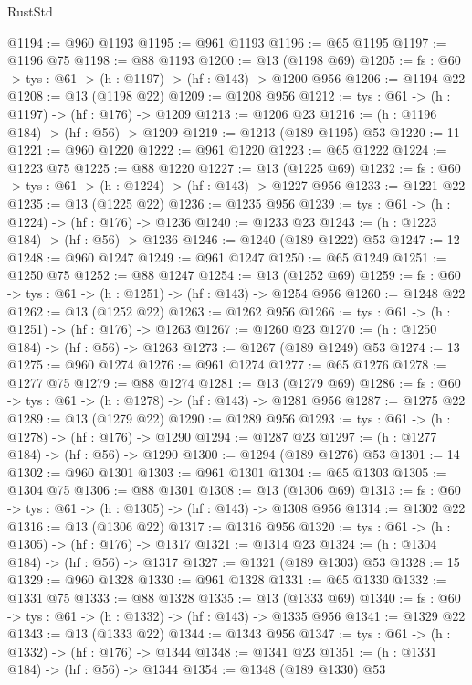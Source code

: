 \begin{lexlean}{RustStd}
\begin{coremodule}
@1194 := @960 @1193
@1195 := @961 @1193
@1196 := @65 @1195
@1197 := @1196 @75
@1198 := @88 @1193
@1200 := @13 (@1198 @69)
@1205 := {fs : @60} -> {tys : @61} -> (h : @1197) -> (hf : @143) -> @1200 @956
@1206 := @1194 @22
@1208 := @13 (@1198 @22)
@1209 := @1208 @956
@1212 := {tys : @61} -> (h : @1197) -> (hf : @176) -> @1209
@1213 := @1206 @23
@1216 := (h : @1196 @184) -> (hf : @56) -> @1209
@1219 := @1213 (@189 @1195) @53
@1220 := 11
@1221 := @960 @1220
@1222 := @961 @1220
@1223 := @65 @1222
@1224 := @1223 @75
@1225 := @88 @1220
@1227 := @13 (@1225 @69)
@1232 := {fs : @60} -> {tys : @61} -> (h : @1224) -> (hf : @143) -> @1227 @956
@1233 := @1221 @22
@1235 := @13 (@1225 @22)
@1236 := @1235 @956
@1239 := {tys : @61} -> (h : @1224) -> (hf : @176) -> @1236
@1240 := @1233 @23
@1243 := (h : @1223 @184) -> (hf : @56) -> @1236
@1246 := @1240 (@189 @1222) @53
@1247 := 12
@1248 := @960 @1247
@1249 := @961 @1247
@1250 := @65 @1249
@1251 := @1250 @75
@1252 := @88 @1247
@1254 := @13 (@1252 @69)
@1259 := {fs : @60} -> {tys : @61} -> (h : @1251) -> (hf : @143) -> @1254 @956
@1260 := @1248 @22
@1262 := @13 (@1252 @22)
@1263 := @1262 @956
@1266 := {tys : @61} -> (h : @1251) -> (hf : @176) -> @1263
@1267 := @1260 @23
@1270 := (h : @1250 @184) -> (hf : @56) -> @1263
@1273 := @1267 (@189 @1249) @53
@1274 := 13
@1275 := @960 @1274
@1276 := @961 @1274
@1277 := @65 @1276
@1278 := @1277 @75
@1279 := @88 @1274
@1281 := @13 (@1279 @69)
@1286 := {fs : @60} -> {tys : @61} -> (h : @1278) -> (hf : @143) -> @1281 @956
@1287 := @1275 @22
@1289 := @13 (@1279 @22)
@1290 := @1289 @956
@1293 := {tys : @61} -> (h : @1278) -> (hf : @176) -> @1290
@1294 := @1287 @23
@1297 := (h : @1277 @184) -> (hf : @56) -> @1290
@1300 := @1294 (@189 @1276) @53
@1301 := 14
@1302 := @960 @1301
@1303 := @961 @1301
@1304 := @65 @1303
@1305 := @1304 @75
@1306 := @88 @1301
@1308 := @13 (@1306 @69)
@1313 := {fs : @60} -> {tys : @61} -> (h : @1305) -> (hf : @143) -> @1308 @956
@1314 := @1302 @22
@1316 := @13 (@1306 @22)
@1317 := @1316 @956
@1320 := {tys : @61} -> (h : @1305) -> (hf : @176) -> @1317
@1321 := @1314 @23
@1324 := (h : @1304 @184) -> (hf : @56) -> @1317
@1327 := @1321 (@189 @1303) @53
@1328 := 15
@1329 := @960 @1328
@1330 := @961 @1328
@1331 := @65 @1330
@1332 := @1331 @75
@1333 := @88 @1328
@1335 := @13 (@1333 @69)
@1340 := {fs : @60} -> {tys : @61} -> (h : @1332) -> (hf : @143) -> @1335 @956
@1341 := @1329 @22
@1343 := @13 (@1333 @22)
@1344 := @1343 @956
@1347 := {tys : @61} -> (h : @1332) -> (hf : @176) -> @1344
@1348 := @1341 @23
@1351 := (h : @1331 @184) -> (hf : @56) -> @1344
@1354 := @1348 (@189 @1330) @53

\end{coremodule}
\end{lexlean}
